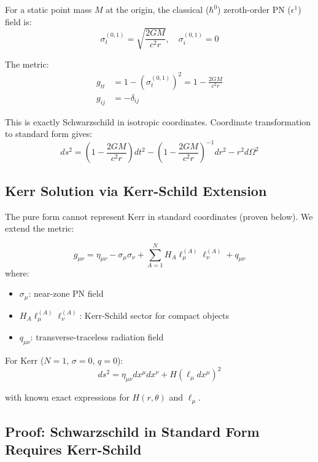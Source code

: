 \documentclass[11pt,a4paper]{article}
\theoremstyle{definition}
\theoremstyle{remark}
\begin{document}
	For a static point mass $M$ at the origin, the classical ($\hbar^0$) zeroth-order PN ($\epsilon^1$) field is:
	\begin{equation}\label{eq:sigma_schwarzschild}
		\sigma_t^{(0,1)} = \sqrt{\frac{2GM}{c^2r}}, \quad \sigma_i^{(0,1)} = 0
	\end{equation}
	
	The metric:
	\begin{align}
		g_{tt} &= 1 - (\sigma_t^{(0,1)})^2 = 1 - \frac{2GM}{c^2r}\\
		g_{ij} &= -\delta_{ij}
	\end{align}
	
	This is exactly Schwarzschild in isotropic coordinates. Coordinate transformation to standard form gives:
	\begin{equation}
		ds^2 = \left(1 - \frac{2GM}{c^2r}\right)dt^2 - \left(1 - \frac{2GM}{c^2r}\right)^{-1}dr^2 - r^2d\Omega^2
	\end{equation}
	
	\subsection{Kerr Solution via Kerr-Schild Extension}
	
	The pure form cannot represent Kerr in standard coordinates (proven below). We extend the metric:
	
		\begin{equation}\label{eq:extended_metric}
			\boxed{g_{\mu\nu} = \eta_{\mu\nu} - \sigma_\mu\sigma_\nu + \sum_{A=1}^N H_A\ell_\mu^{(A)}\ell_\nu^{(A)} + q_{\mu\nu}}
		\end{equation}
		where:
		\begin{itemize}
			\item $\sigma_\mu$: near-zone PN field
			\item $H_A\ell_\mu^{(A)}\ell_\nu^{(A)}$: Kerr-Schild sector for compact objects
			\item $q_{\mu\nu}$: transverse-traceless radiation field
		\end{itemize}
	
	For Kerr ($N=1$, $\sigma=0$, $q=0$):
	\begin{equation}
		ds^2 = \eta_{\mu\nu}dx^\mu dx^\nu + H(\ell_\mu dx^\mu)^2
	\end{equation}
	
	with known exact expressions for $H(r,\theta)$ and $\ell_\mu$.
	
	\subsection{Proof: Schwarzschild in Standard Form Requires Kerr-Schild}
	
\end{document}
